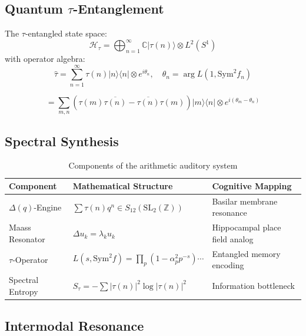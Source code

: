 \documentclass[12pt]{article}
\begin{document}
\subsection{Quantum $\tau$-Entanglement}

\begin{definition}
The $\tau$-entangled state space:
\begin{equation}
    \mathcal{H}_\tau = \bigoplus_{n=1}^\infty \mathbb{C}|\tau(n)\rangle \otimes L^2(S^1)
\end{equation}
with operator algebra:
\begin{equation}
    \hat{\tau} = \sum_{n=1}^\infty \tau(n) |n\rangle\langle n| \otimes e^{i\theta_n}, \quad \theta_n = \arg L(1, \text{Sym}^2 f_n)
\end{equation}
\end{definition}

\begin{equation}
    [\hat{\tau}, \hat{\tau}^\dagger] = \sum_{m,n} (\tau(m)\overline{\tau(n)} - \overline{\tau(n)}\tau(m))|m\rangle\langle n| \otimes e^{i(\theta_m-\theta_n)}
\end{equation}

\subsection{Spectral Synthesis}

\begin{table}[h]
    \centering
    \begin{tabular}{lll}
    \toprule
    Component & Mathematical Structure & Cognitive Mapping \\
    \midrule
    $\Delta(q)$-Engine & $\sum \tau(n)q^n \in S_{12}(\text{SL}_2(\mathbb{Z}))$ & Basilar membrane resonance \\
    Maass Resonator & $\Delta u_k = \lambda_k u_k$ & Hippocampal place field analog \\
    $\tau$-Operator & $L(s, \text{Sym}^2 f) = \prod_p (1-\alpha_p^2p^{-s})\cdots$ & Entangled memory encoding \\
    Spectral Entropy & $S_\tau = -\sum |\tau(n)|^2 \log|\tau(n)|^2$ & Information bottleneck \\
    \bottomrule
    \end{tabular}
    \caption{Components of the arithmetic auditory system}
\end{table}

\subsection{Intermodal Resonance}
\end{document}
